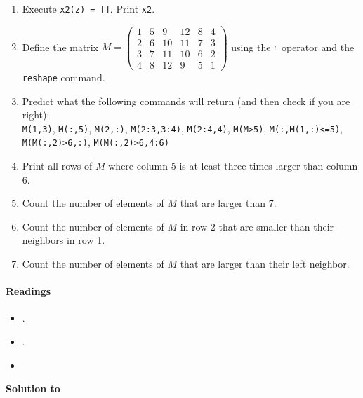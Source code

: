 \begin{enumerate}
	\item Execute \texttt{x2(z) = []}. Print \texttt{x2}.
	\item Define the matrix $M = \begin{pmatrix}
		1&     5&     9&    12&     8&     4\\
		2&     6&    10&    11&     7&     3\\
		3&     7&    11&    10&     6&     2\\
		4&     8&    12&     9&     5&     1 \end{pmatrix}$
		using the $:$ operator and the \texttt{reshape} command.
	\item Predict what the following commands will return (and then check if you are right):\\
	\texttt{M(1,3)},
	\texttt{M(:,5)},
	\texttt{M(2,:)},
	\texttt{M(2:3,3:4)},
	\texttt{M(2:4,4)},
	\texttt{M(M>5)},
	\texttt{M(:,M(1,:)<=5)},
	\texttt{M(M(:,2)>6,:)},
	\texttt{M(M(:,2)>6,4:6)}
	\item Print all rows of $M$ where column 5 is at least three times larger than column 6.
	\item Count the number of elements of $M$ that are larger than 7.
	\item Count the number of elements of $M$ in row 2 that are smaller than their neighbors in row 1.
	\item Count the number of elements of $M$ that are larger than their left neighbor.
\end{enumerate}


\paragraph{Readings}
\begin{itemize}
	\item \textcite[Appendix A]{Brandimarte_2006_NumericalMethodsFinance}.
	\item \textcite[Appendix B]{Miranda.Fackler_2002_AppliedComputationalEconomics}.
	\item \textcite{Pfeifer_2017_MATLABHandout}
\end{itemize}

\begin{solution}\textbf{Solution to }
\ifDisplaySolutions

\fi
\newpage
\end{solution}